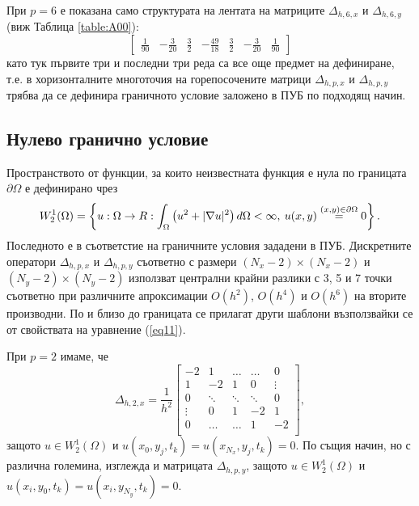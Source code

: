 \documentclass[a4paper]{article}
\newcommand{\be}{\begin{equation}}
\newcommand{\ee}{\end{equation}}
\newcommand{\rf}[1]{(\ref{#1})}
\theoremstyle{remark}
\begin{document}
При $p=6$ е показана само структурата на лентата на матриците $\Delta_{h,6,x}$ и $\Delta_{h,6,y}$ (виж Таблица \ref{table:A00}):
\[
\begin{bmatrix}
    \frac{1}{90}	& -\frac{3}{20}	& \frac{3}{2}         	& -\frac{49}{18}	&  \frac{3}{2}    	 &   -\frac{3}{20}	  &      \frac{1}{90}
\end{bmatrix}
\]
като тук първите три и последни три реда са все още предмет на дефиниране, т.е. в хоризонталните многоточия на горепосочените матрици $\Delta_{h,p,x}$ и $\Delta_{h,p,y}$ трябва да се дефинира граничното условие заложено в ПУБ по подходящ начин.

\subsection{Нулево гранично условие}\label{zeroBndHead}
Пространството от функции, за които неизвестната функция е нула по границата $\partial\Omega$ е дефинирано чрез
\be\label{funSpace}
W_2^1(\Omega) =\left\{ u:\Omega \rightarrow \\R : \int_{\Omega} \left(u^2 + |\nabla u|^2 \right)d\Omega < \infty, \: u(x,y) \overset{(x, y) \in \partial\Omega}{=} 0 \right\}.
\ee
Последното е в съответстие на граничните условия зададени в ПУБ. Дискретните оператори $\Delta_{h,p,x}$ и $\Delta_{h,p,y}$ съответно с размери $(N_x-2) \times (N_x-2)$ и $(N_y-2)\times(N_y-2)$ използват централни крайни разлики с 3, 5 и 7 точки съответно при различните апроксимации $O(h^2)$, $O(h^4)$ и $O(h^6)$ на вторите производни. По и близо до границата се прилагат други шаблони възползвайки се от свойствата на уравнение \rf{eq11}. 

При $p=2$ имаме, че 
\[
\Delta_{h,2,x} = \frac{1}{h^2}
\begin{bmatrix}
    -2	       & 1        &     \dots   &   \dots        & 0   \\
    1               & -2            &   1           &   0               & \vdots    \\
        0           & \ddots        &    \ddots    &   \ddots       &  0 \\ 
    \vdots       &     0            &  1     	& -2    	   & 1 \\
    0               & \dots          &  \dots         & 1  	   & -2 \\
\end{bmatrix},
\]
защото $u \in W_2^1(\Omega)$ и $u(x_0, y_j, t_k) = u(x_{N_x}, y_j, t_k) = 0$. По същия начин, но с различна големина, изглежда и матрицата $\Delta_{h,p,y}$, защото $u \in W_2^1(\Omega)$ и $u(x_i, y_0, t_k) = u(x_i, y_{N_y}, t_k) = 0$. 
\end{document}
